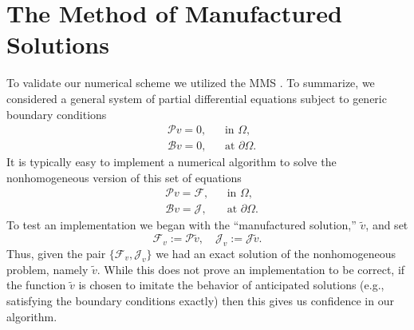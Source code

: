 \section{The Method of Manufactured Solutions}
\label{intro:validation}

To validate our numerical scheme we utilized the MMS \cite{Burggraf66,Roache02,Roy05}.
To summarize, we considered a general system of
partial differential equations subject to generic boundary conditions
\begin{align*}
& \mathcal{P} v = 0, && \text{in $\Omega$}, \\
& \mathcal{B} v = 0, && \text{at $\partial \Omega$}.
\end{align*}
It is typically easy to implement a numerical algorithm to solve
the nonhomogeneous version of this set of equations
\begin{align*}
& \mathcal{P} v = \mathcal{F}, && \text{in $\Omega$}, \\
& \mathcal{B} v = \mathcal{J}, && \text{at $\partial \Omega$}.
\end{align*}
To test an implementation we began with the ``manufactured solution,''
$\tilde{v}$, and set
\begin{equation*}
\mathcal{F}_v := \mathcal{P} \tilde{v},
\quad
\mathcal{J}_v := \mathcal{J} \tilde{v}.
\end{equation*}
Thus, given the pair $\{ \mathcal{F}_v, \mathcal{J}_v \}$ we had an exact
solution of the nonhomogeneous problem, namely $\tilde{v}$. While this
does not prove an implementation to be correct, if the function $\tilde{v}$
is chosen to imitate the behavior of anticipated solutions (e.g.,
satisfying the boundary conditions exactly) then this gives us
confidence in our algorithm. 